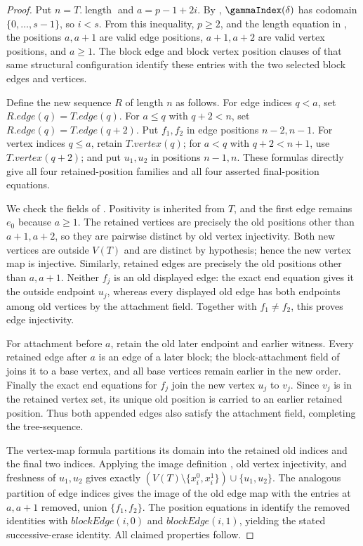 \begin{proof}
Put $n=T.\operatorname{length}$ and $a=p-1+2i$.  By
, $\gammaIndex(\delta)$ has codomain
$\{0,\ldots,s-1\}$, so $i<s$.  From this inequality, $p\ge2$, and the
length equation in , the
positions $a,a+1$ are valid edge positions, $a+1,a+2$ are valid vertex
positions, and $a\ge1$.  The block edge and block vertex position
clauses of that same structural configuration identify these entries
with the two selected block edges and vertices.

Define the new sequence $R$ of length $n$ as follows.  For edge indices
$q<a$, set $R.edge(q)=T.edge(q)$.  For $a\le q$ with $q+2<n$, set
$R.edge(q)=T.edge(q+2)$.  Put $f_1,f_2$ in edge positions $n-2,n-1$.
For vertex indices $q\le a$, retain $T.vertex(q)$; for $a<q$ with
$q+2<n+1$, use $T.vertex(q+2)$; and put $u_1,u_2$ in positions $n-1,n$.
These formulas directly give all four retained-position families and all
four asserted final-position equations.

We check the fields of .  Positivity is inherited
from $T$, and the first edge remains $e_0$ because $a\ge1$.  The retained
vertices are precisely the old positions other than $a+1,a+2$, so they
are pairwise distinct by old vertex injectivity.  Both new vertices are
outside $V(T)$ and are distinct by hypothesis; hence the new vertex map
is injective.  Similarly, retained edges are precisely the old positions
other than $a,a+1$.  Neither $f_j$ is an old displayed edge: the exact
end equation gives it the outside endpoint $u_j$, whereas every displayed
old edge has both endpoints among old vertices by the attachment field.
Together with $f_1\ne f_2$, this proves edge injectivity.

For attachment before $a$, retain the old later endpoint and earlier
witness.  Every retained edge after $a$ is an edge of a later block; the
block-attachment field of  joins
it to a base vertex, and all base vertices remain earlier in the new
order.  Finally the exact end equations for $f_j$ join the new vertex
$u_j$ to $v_j$.  Since $v_j$ is in the retained vertex set, its unique old
position is carried to an earlier retained position.  Thus both appended
edges also satisfy the attachment field, completing the tree-sequence.

The vertex-map formula partitions its domain into the retained old
indices and the final two indices.  Applying the image definition
, old vertex injectivity, and freshness of
$u_1,u_2$ gives exactly
$(V(T)\setminus\{x_i^0,x_i^1\})\cup\{u_1,u_2\}$.  The analogous
partition of edge indices gives the image of the old edge map with the
entries at $a,a+1$ removed, union $\{f_1,f_2\}$.  The position equations
in  identify the removed
identities with $blockEdge(i,0)$ and $blockEdge(i,1)$, yielding the stated
successive-erase identity.  All claimed properties follow.
\end{proof}

